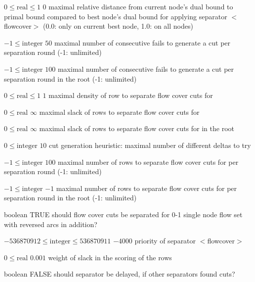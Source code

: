 %
{$0\leq\textrm{real}\leq1$}%
{$0$}%
{maximal relative distance from current node's dual bound to primal bound compared to best node's dual bound for applying separator $<$flowcover$>$ (0.0: only on current best node, 1.0: on all nodes)}%
{}

%
{$-1\leq\textrm{integer}$}%
{$50$}%
{maximal number of consecutive fails to generate a cut per separation round (-1: unlimited)}%
{}

%
{$-1\leq\textrm{integer}$}%
{$100$}%
{maximal number of consecutive fails to generate a cut per separation round in the root (-1: unlimited)}%
{}

%
{$0\leq\textrm{real}\leq1$}%
{$1$}%
{maximal density of row to separate flow cover cuts for}%
{}

%
{$0\leq\textrm{real}$}%
{$\infty$}%
{maximal slack of rows to separate flow cover cuts for}%
{}

%
{$0\leq\textrm{real}$}%
{$\infty$}%
{maximal slack of rows to separate flow cover cuts for in the root}%
{}

%
{$0\leq\textrm{integer}$}%
{$10$}%
{cut generation heuristic: maximal number of different deltas to try}%
{}

%
{$-1\leq\textrm{integer}$}%
{$100$}%
{maximal number of rows to separate flow cover cuts for per separation round (-1: unlimited)}%
{}

%
{$-1\leq\textrm{integer}$}%
{$-1$}%
{maximal number of rows to separate flow cover cuts for per separation round in the root (-1: unlimited)}%
{}

%
{boolean}%
{TRUE}%
{should flow cover cuts be separated for 0-1 single node flow set with reversed arcs in addition?}%
{}

%
{$-536870912\leq\textrm{integer}\leq536870911$}%
{$-4000$}%
{priority of separator $<$flowcover$>$}%
{}

%
{$0\leq\textrm{real}$}%
{$0.001$}%
{weight of slack in the scoring of the rows}%
{}

%
{boolean}%
{FALSE}%
{should separator be delayed, if other separators found cuts?}%
{}

